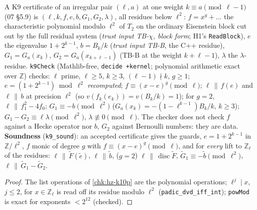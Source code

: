 \begin{definition}\label{chk:hz-k9}
  \leanok
  A K9 certificate of an irregular pair $(\ell,a)$ at one weight $k\equiv a\pmod{\ell-1}$ (07 \S5.9) is $(\ell,k,f,e,b,G_1,G_2,\lambda)$, all
  residues below $\ell^2$: $f=x^g+\dots$ the characteristic polynomial modulo $\ell^2$ of $T_2$ on the ordinary Eisenstein block cut out by the
  full residual system (\emph{trust input TB-$\chi$, block form}; H1's \texttt{ReadBlock}), $e$ the eigenvalue $1+2^{k-1}$, $b=B_k/k$
  (\emph{trust input TB-B}, the C++ residue), $G_1=G_a(x_k)$, $G_2=G_a(x_{k+\ell-1})$ (TB-B at the weight $k+\ell-1$), $\lambda$ the
  $\lambda$-residue. \texttt{k9Check} (Mathlib-free, \texttt{decide +kernel}; polynomial arithmetic exact over $\mathbb Z$) checks: $\ell$ prime,
  $\ell\ge5$, $k\ge3$, $(\ell-1)\nmid k$, $g\ge1$; $e=(1+2^{k-1})\bmod\ell^2$ \emph{recomputed}; $f\equiv(x-e)^g\pmod\ell$; $\ell\,\|\,f(e)$ and
  $\ell\,\|\,b$ at precision $\ell^2$ (so $v(f_k(e_k))=v(B_k/k)=1$); for $g=2$, $\ell\,\|\,f_1^2-4f_0$; $G_1\equiv-b\pmod{\ell^2}$
  ($G_a(x_k)=-(1-\ell^{k-1})B_k/k$, $k\ge3$); $G_1-G_2\equiv\ell\lambda\pmod{\ell^2}$, $\lambda\not\equiv0\pmod\ell$. The checker does not check $f$
  against a Hecke operator nor $b$, $G_2$ against Bernoulli numbers: they are data. \textbf{Soundness} (\texttt{k9\_sound}): an accepted
  certificate gives the guards, $e=1+2^{k-1}$ in $\mathbb Z/\ell^2$, $f$ monic of degree $g$ with $f\equiv(x-e)^g\pmod\ell$, and for \emph{every}
  lift to $\mathbb Z_\ell$ of the residues: $\ell\,\|\,\tilde F(\tilde e)$, $\ell\,\|\,\tilde b$, ($g=2$) $\ell\,\|\,\operatorname{disc}\tilde F$,
  $\tilde G_1\equiv-\tilde b\pmod{\ell^2}$, $\ell\,\|\,\tilde G_1-\tilde G_2$.
\end{definition}
\begin{proof}
  \leanok
  The list operations of \ref{chk:hz-k10p} are the polynomial operations; $\ell^j\mid x$, $j\le2$, for $x\in\mathbb Z_\ell$ is read off its residue
  modulo $\ell^2$ (\texttt{padic\_dvd\_iff\_int}); \texttt{powMod} is exact for exponents $<2^{12}$ (checked).
\end{proof}

